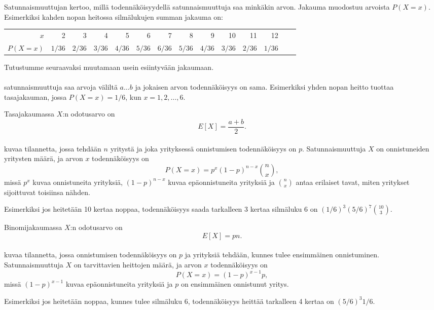 Satunnaismuuttujan  kertoo,
millä todennäköisyydellä satunnaismuuttuja
saa minkäkin arvon.
Jakauma muodostuu arvoista $P(X=x)$.
Esimerkiksi kahden nopan heitossa
silmälukujen summan jakauma on:
\begin{center}
\small {
\begin{tabular}{r|rrrrrrrrrrrrr}
$x$ & 2 & 3 & 4 & 5 & 6 & 7 & 8 & 9 & 10 & 11 & 12 \\
$P(X=x)$ & $1/36$ & $2/36$ & $3/36$ & $4/36$ & $5/36$ & $6/36$ & $5/36$ & $4/36$ & $3/36$ & $2/36$ & $1/36$ \\
\end{tabular}
}
\end{center}
Tutustumme seuraavaksi muutamaan usein esiintyvään jakaumaan.
~\\\\
 satunnaismuuttuja
saa arvoja väliltä $a \ldots b$
ja jokaisen arvon todennäköisyys on sama.
Esimerkiksi yhden nopan heitto tuottaa tasajakauman,
jossa $P(X=x)=1/6$, kun $x=1,2,\ldots,6$.

Tasajakaumassa $X$:n odotusarvo on
\[E[X] = \frac{a+b}{2}.\]
~\\
 kuvaa tilannetta, jossa tehdään $n$
yritystä ja joka yrityksessä onnistumisen
todennäköisyys on $p$. Satunnaismuuttuja $X$
on onnistuneiden yritysten määrä,
ja arvon $x$ todennäköisyys on
\[P(X=x)=p^x (1-p)^{n-x} {n \choose x},\]
missä $p^x$ kuvaa onnistuneita yrityksiä,
$(1-p)^{n-x}$ kuvaa epäonnistuneita yrityksiä
ja ${n \choose x}$ antaa erilaiset tavat,
miten yritykset sijoittuvat toisiinsa nähden.

Esimerkiksi jos heitetään 10 kertaa noppaa,
todennäköisyys saada tarkalleen 3 kertaa silmäluku 6
on $(1/6)^3 (5/6)^7 {10 \choose 3}$.

Binomijakaumassa $X$:n odotusarvo on
\[E[X] = pn.\]
~\\
 kuvaa tilannetta,
jossa onnistumisen todennäköisyys on $p$
ja yrityksiä tehdään, kunnes tulee ensimmäinen
onnistuminen. Satunnaismuuttuja $X$ on
tarvittavien heittojen määrä,
ja arvon $x$ todennäköisyys on
\[P(X=x)=(1-p)^{x-1} p,\]
missä $(1-p)^{x-1}$ kuvaa epäonnistuneita yrityksiä ja
$p$ on ensimmäinen onnistunut yritys.

Esimerkiksi jos heitetään noppaa,
kunnes tulee silmäluku 6, todennäköisyys
heittää tarkalleen 4 kertaa on $(5/6)^3 1/6$.

